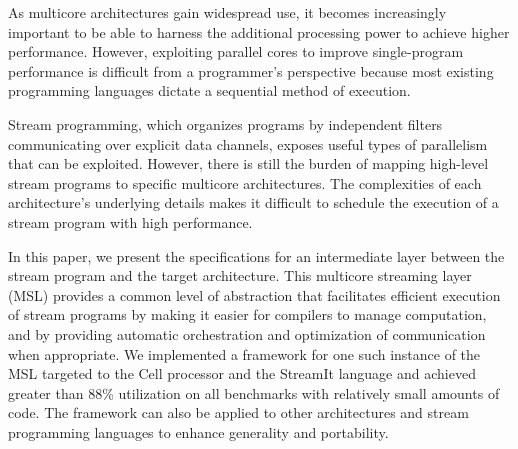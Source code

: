 %
%
%
%
%
%
%
%
%
%
% 
% 
%

As multicore architectures gain widespread use, it becomes
increasingly important to be able to harness the additional processing
power to achieve higher performance. However, exploiting parallel
cores to improve single-program performance is difficult from a
programmer's perspective because most existing programming languages
dictate a sequential method of execution.

Stream programming, which organizes programs by independent filters
communicating over explicit data channels,  exposes useful types of
parallelism that can be exploited. However, there is still the burden
of mapping high-level stream programs to specific multicore
architectures. The complexities of each architecture's underlying
details makes it difficult to schedule the execution of a stream
program with high performance.

In this paper, we present the specifications for an intermediate layer
between the stream program and the target architecture. This multicore
streaming layer (MSL) provides a common level of abstraction that
facilitates efficient execution of stream programs by making it easier
for compilers to manage computation, and by providing automatic
orchestration and optimization of communication when appropriate. We
implemented a framework for one such instance of the MSL targeted to
the Cell processor and the StreamIt language and achieved greater than
88\% utilization on all benchmarks with relatively small amounts of
code. The framework can also be applied to other architectures and
stream programming languages to enhance generality and portability.

